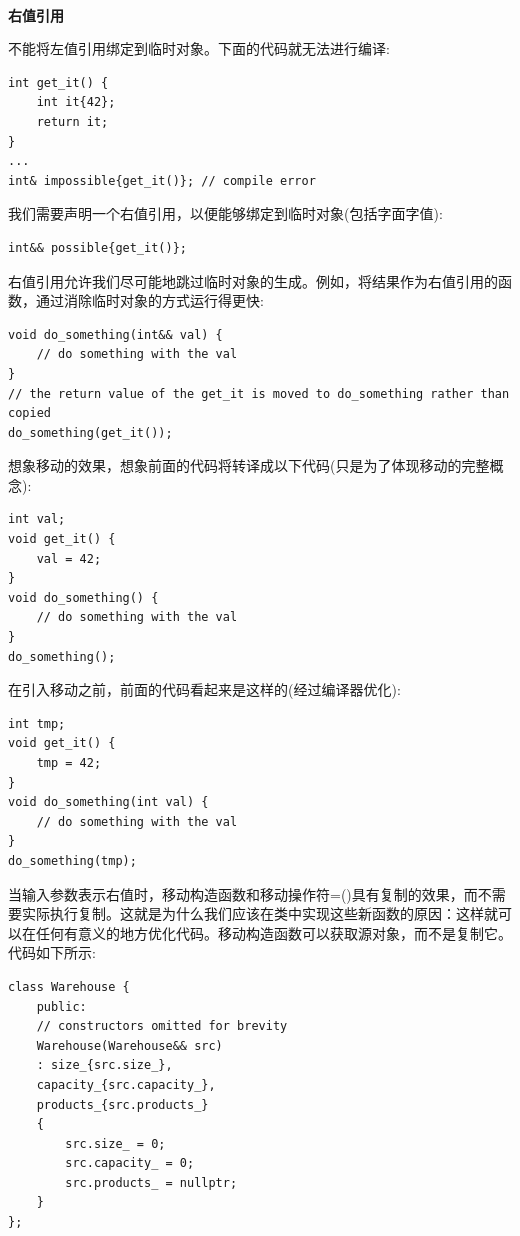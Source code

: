 \noindent\textbf{}\ \par
\textbf{右值引用} \ \par
不能将左值引用绑定到临时对象。下面的代码就无法进行编译: \par

\begin{lstlisting}[caption={}]
int get_it() {
	int it{42};
	return it;
}
...
int& impossible{get_it()}; // compile error
\end{lstlisting}

我们需要声明一个右值引用，以便能够绑定到临时对象(包括字面字值): \par

\begin{lstlisting}[caption={}]
int&& possible{get_it()};
\end{lstlisting}

右值引用允许我们尽可能地跳过临时对象的生成。例如，将结果作为右值引用的函数，通过消除临时对象的方式运行得更快: \par

\begin{lstlisting}[caption={}]
void do_something(int&& val) {
	// do something with the val
}
// the return value of the get_it is moved to do_something rather than
copied
do_something(get_it());
\end{lstlisting}

想象移动的效果，想象前面的代码将转译成以下代码(只是为了体现移动的完整概念):\par

\begin{lstlisting}[caption={}]
int val;
void get_it() {
	val = 42;
}
void do_something() {
	// do something with the val
}
do_something();
\end{lstlisting}

在引入移动之前，前面的代码看起来是这样的(经过编译器优化):\par

\begin{lstlisting}[caption={}]
int tmp;
void get_it() {
	tmp = 42;
}
void do_something(int val) {
	// do something with the val
}
do_something(tmp);
\end{lstlisting}

当输入参数表示右值时，移动构造函数和移动操作符=()具有复制的效果，而不需要实际执行复制。这就是为什么我们应该在类中实现这些新函数的原因：这样就可以在任何有意义的地方优化代码。移动构造函数可以获取源对象，而不是复制它。代码如下所示: \par

\begin{lstlisting}[caption={}]
class Warehouse {
	public:
	// constructors omitted for brevity
	Warehouse(Warehouse&& src)
	: size_{src.size_},
	capacity_{src.capacity_},
	products_{src.products_}
	{
		src.size_ = 0;
		src.capacity_ = 0;
		src.products_ = nullptr;
	}
};
\end{lstlisting}

